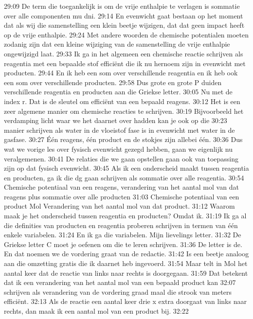 29:09
De term die toegankelijk is om de vrije enthalpie te verlagen is sommatie over alle componenten mu dni.
29:14
En evenwicht gaat bestaan op het moment dat als wij die samenstelling een klein beetje wijzigen, dat dat geen impact heeft op de vrije enthalpie.
29:24
Met andere woorden de chemische potentialen moeten zodanig zijn dat een kleine wijziging van de samenstelling de vrije enthalpie ongewijzigd laat.
29:33
Ik ga in het algemeen een chemische reactie schrijven als reagentia met een bepaalde stof efficiënt die ik nu hernoem zijn in evenwicht met producten.
29:44
En ik heb een som over verschillende reagentia en ik heb ook een som over verschillende producten.
29:58
Dus grote en grote P duiden verschillende reagentia en producten aan die Griekse letter.
30:05
Nu met de index r. Dat is de sleutel om efficiënt van een bepaald reagens.
30:12
Het is een zeer algemene manier om chemische reacties te schrijven.
30:19
Bijvoorbeeld het verdamping licht waar we het daarnet over hadden kan je ook op die
30:23
manier schrijven als water in de vloeistof fase is in evenwicht met water in de gasfase.
30:27
Één reagens, één product en de stokjes zijn allebei één.
30:36
Dus wat we vorige les over fysisch evenwicht gezegd hebben, gaan we eigenlijk nu veralgemenen.
30:41
De relaties die we gaan opstellen gaan ook van toepassing zijn op dat fysisch evenwicht.
30:45
Als ik een onderscheid maakt tussen reagentia en producten, ga ik die dg gaan schrijven als sommatie over alle reagentia.
30:54
Chemische potentiaal van een reagens, verandering van het aantal mol van dat reagens plus sommatie over alle producten
31:03
Chemische potentiaal van een product Mol Verandering van het aantal mol van dat product.
31:12
Waarom maak je het onderscheid tussen reagentia en producten? Omdat ik.
31:19
Ik ga al die definities van producten en reagentia proberen schrijven in termen van één enkele variabelen.
31:24
En ik ga die variabelen. Mijn lievelings letter.
31:32
De Griekse letter C moet je oefenen om die te leren schrijven.
31:36
De letter is de. En dat noemen we de vordering graat van de redactie.
31:42
Is een beetje analoog aan die omzetting gratis die ik daarnet heb ingevoerd.
31:54
Maar telt in Mol het aantal keer dat de reactie van links naar rechts is doorgegaan.
31:59
Dat betekent dat ik een verandering van het aantal mol van een bepaald product kan
32:07
schrijven als verandering van de vordering graad maal die strook van meters efficiënt.
32:13
Als de reactie een aantal keer drie x extra doorgaat van links naar rechts, dan maak ik een aantal mol van een product bij.
32:22
